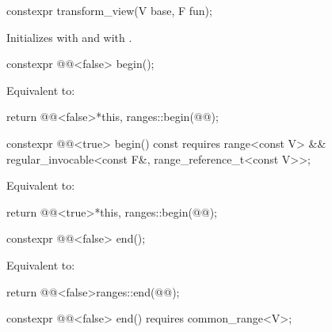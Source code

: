 %
\begin{itemdecl}
constexpr transform_view(V base, F fun);
\end{itemdecl}

\begin{itemdescr}
\pnum
\effects
Initializes  with  and
 with .
\end{itemdescr}

%
\begin{itemdecl}
constexpr @@<false> begin();
\end{itemdecl}

\begin{itemdescr}
\pnum
\effects
Equivalent to:
\begin{codeblock}
return @@<false>{*this, ranges::begin(@@)};
\end{codeblock}
\end{itemdescr}

%
\begin{itemdecl}
constexpr @@<true> begin() const
  requires range<const V> &&
           regular_invocable<const F&, range_reference_t<const V>>;
\end{itemdecl}

\begin{itemdescr}
\pnum
\effects
Equivalent to:
\begin{codeblock}
return @@<true>{*this, ranges::begin(@@)};
\end{codeblock}
\end{itemdescr}

%
\begin{itemdecl}
constexpr @@<false> end();
\end{itemdecl}

\begin{itemdescr}
\pnum
\effects
Equivalent to:
\begin{codeblock}
return @@<false>{ranges::end(@@)};
\end{codeblock}
\end{itemdescr}

%
\begin{itemdecl}
constexpr @@<false> end() requires common_range<V>;
\end{itemdecl}

